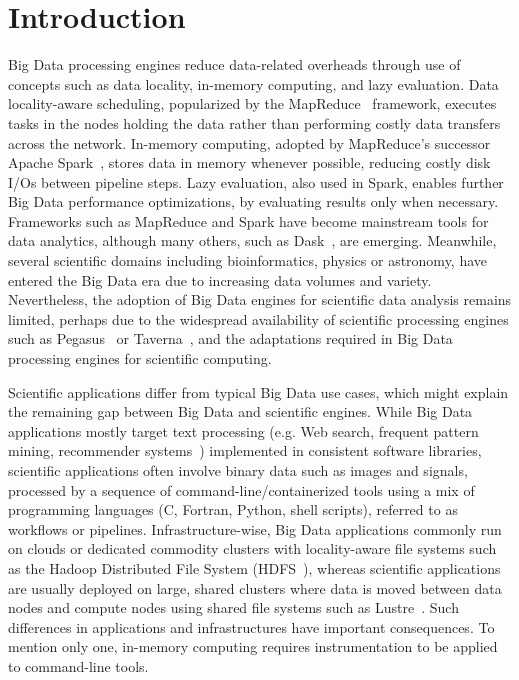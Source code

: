 \documentclass{IEEEtran}
\begin{document}

\section{Introduction} %

Big Data processing engines reduce data-related overheads through 
use of concepts such as data locality, in-memory computing, and lazy evaluation.
Data locality-aware scheduling, popularized by the MapReduce~\cite{dean2008mapreduce} 
framework, executes tasks in the nodes holding the data rather than 
performing costly data transfers across the network. In-memory 
computing, adopted by MapReduce's successor Apache 
Spark~\cite{zaharia2016apache}, stores data in memory whenever 
possible, reducing costly disk I/Os between pipeline steps. 
Lazy evaluation, also used in Spark, enables further Big Data performance 
optimizations, by evaluating results only when necessary. Frameworks 
such as
MapReduce and Spark have become mainstream tools for data analytics, 
although many others, such as 
Dask~\cite{rocklin2015dask}, are emerging. 
Meanwhile, several scientific 
domains including bioinformatics, physics or astronomy, have entered 
the Big Data era due to increasing data volumes and variety. 
Nevertheless, the adoption of Big Data engines for scientific data analysis 
remains limited, perhaps due to the widespread availability of 
scientific processing engines such as Pegasus~\cite{deelman2005pegasus} or
Taverna~\cite{oinn2004taverna}, and the adaptations required in Big 
Data processing engines for scientific computing. 

Scientific applications differ from typical Big Data use 
cases, which might explain the remaining gap between Big Data and 
scientific engines. While Big Data applications mostly target text 
processing (e.g. Web search, frequent pattern mining, recommender 
systems~\cite{leskovec2014mining}) implemented in consistent software 
libraries, scientific applications often involve 
binary data such as images and signals, processed by a sequence of 
command-line/containerized tools
using a mix of programming languages (C, Fortran, Python, shell 
scripts), referred to as workflows or pipelines. Infrastructure-wise, 
Big Data applications commonly run on 
clouds or dedicated commodity clusters with locality-aware file systems 
such as the Hadoop Distributed File System 
(HDFS~\cite{shvachko2010hadoop}), whereas scientific applications are 
usually deployed on large, shared clusters where data is moved between
data nodes and compute nodes using shared file systems such 
as Lustre~\cite{schwan2003lustre}. Such differences in applications and 
infrastructures have important consequences. To 
mention only one, in-memory computing requires instrumentation to be 
applied to command-line tools. 
\end{document}
